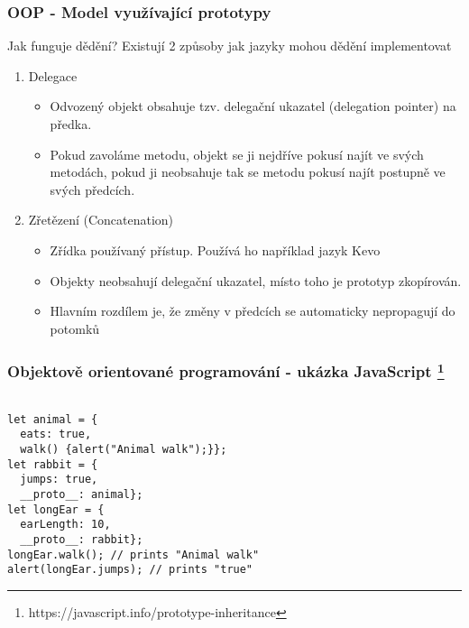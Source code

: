 \begin{frame}
    \frametitle{OOP - Model využívající prototypy}

    Jak funguje dědění?\break
    Existují 2 způsoby jak jazyky mohou dědění implementovat

    \begin{enumerate}
        \item Delegace \begin{itemize}
            \item Odvozený objekt obsahuje tzv. delegační ukazatel (delegation pointer) na předka.
            \item Pokud zavoláme metodu, objekt se ji nejdříve pokusí najít ve svých metodách, pokud ji neobsahuje tak se metodu pokusí najít postupně ve svých předcích.  
        \end{itemize}
        \item Zřetězení (Concatenation) \begin{itemize}
            \item Zřídka používaný přístup. Používá ho například jazyk Kevo
            \item Objekty neobsahují delegační ukazatel, místo toho je prototyp zkopírován.
            \item Hlavním rozdílem je, že změny v předcích se automaticky nepropagují do potomků
        \end{itemize}
    \end{enumerate}

\end{frame}


\begin{frame}[fragile]
    \frametitle{Objektově orientované programování - ukázka JavaScript \footnote{https://javascript.info/prototype-inheritance}   }
\begin{lstlisting}[]

let animal = {
  eats: true,
  walk() {alert("Animal walk");}};
let rabbit = {
  jumps: true,
  __proto__: animal};
let longEar = {
  earLength: 10,
  __proto__: rabbit};
longEar.walk(); // prints "Animal walk"
alert(longEar.jumps); // prints "true"

\end{lstlisting}
    
\end{frame}